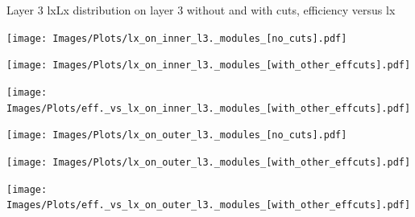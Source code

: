 \documentclass{beamer}
\begin{document}
\begin{frame}{Layer 3 lx}{Lx distribution on layer 3 without and with cuts, efficiency versus lx}
\begin{minipage}{0.32\textwidth}
  \centering
  \texttt{[image: Images/Plots/lx\_on\_inner\_l3.\_modules\_[no\_cuts].pdf]}
\end{minipage}%
\hspace{0.01\textwidth}%
\begin{minipage}{0.32\textwidth}
  \centering
  \texttt{[image: Images/Plots/lx\_on\_inner\_l3.\_modules\_[with\_other\_effcuts].pdf]}
\end{minipage}%
\hspace{0.01\textwidth}%
\begin{minipage}{0.32\textwidth}
  \centering
  \texttt{[image: Images/Plots/eff.\_vs\_lx\_on\_inner\_l3.\_modules\_[with\_other\_effcuts].pdf]}
\end{minipage}
\begin{minipage}{0.32\textwidth}
  \centering
  \texttt{[image: Images/Plots/lx\_on\_outer\_l3.\_modules\_[no\_cuts].pdf]}
\end{minipage}%
\hspace{0.01\textwidth}%
\begin{minipage}{0.32\textwidth}
  \centering
  \texttt{[image: Images/Plots/lx\_on\_outer\_l3.\_modules\_[with\_other\_effcuts].pdf]}
\end{minipage}%
\hspace{0.01\textwidth}%
\begin{minipage}{0.32\textwidth}
  \centering
  \texttt{[image: Images/Plots/eff.\_vs\_lx\_on\_outer\_l3.\_modules\_[with\_other\_effcuts].pdf]}
\end{minipage}
\end{frame}
\end{document}
